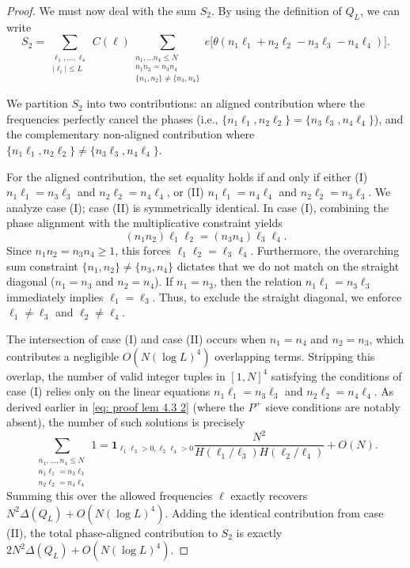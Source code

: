 \documentclass[12pt]{amsart}
\renewcommand{\leq}{\leqslant}
\renewcommand{\ge}{\geqslant}
\numberwithin{equation}{section}
\theoremstyle{plain}
\theoremstyle{definition}
\renewcommand{\l}{\ell}
\begin{document}
\begin{proof}
		We must now deal with the sum $S_2$. By using the definition of $Q_L$, we can write
		$$S_2 = \sum_{\substack{\l_1,\dots ,\l_4 \\ |\l_i| \leq L}}C(\bm{\l})\sum_{\substack{n_1,\dots n_4 \leq N \\ n_1n_2=n_3n_4 \\ \{n_1,n_2\}\ne\{n_3,n_4\}}}e\big[\theta (n_1\l_1+n_2\l_2-n_3\l_3-n_4\l_4)\big].$$
		
		We partition $S_2$ into two contributions: an aligned contribution where the frequencies perfectly cancel the phases (i.e., $\{n_1\l_1,n_2\l_2\}=\{n_3\l_3,n_4\l_4\}$), and the complementary non-aligned contribution where $\{n_1\l_1,n_2\l_2\}\ne\{n_3\l_3,n_4\l_4\}$. 
		
		For the aligned contribution, the set equality holds if and only if either (I) $n_1\l_1=n_3\l_3$ and $n_2\l_2=n_4\l_4$, or (II) $n_1\l_1=n_4\l_4$ and $n_2\l_2=n_3\l_3$. We analyze case (I); case (II) is symmetrically identical. In case (I), combining the phase alignment with the multiplicative constraint yields 
		$$ (n_1 n_2) \l_1 \l_2 = (n_3 n_4) \l_3 \l_4. $$
		Since $n_1n_2 = n_3n_4 \ge 1$, this forces $\l_1\l_2 = \l_3\l_4$. Furthermore, the overarching sum constraint $\{n_1, n_2\} \ne \{n_3, n_4\}$ dictates that we do not match on the straight diagonal ($n_1=n_3$ and $n_2=n_4$). If $n_1 = n_3$, then the relation $n_1\l_1 = n_3\l_3$ immediately implies $\l_1 = \l_3$. Thus, to exclude the straight diagonal, we enforce $\l_1 \ne \l_3$ and $\l_2 \ne \l_4$. 
		
		The intersection of case (I) and case (II) occurs when $n_1=n_4$ and $n_2=n_3$, which contributes a negligible $O(N(\log L)^4)$ overlapping terms. Stripping this overlap, the number of valid integer tuples in $[1, N]^4$ satisfying the conditions of case (I) relies only on the linear equations $n_1\l_1=n_3\l_3$ and $n_2\l_2=n_4\l_4$. As derived earlier in \eqref{eq: proof lem 4.3 2} (where the $P^+$ sieve conditions are notably absent), the number of such solutions is precisely 
		$$ \sum_{\substack{n_1,\dots,n_4 \leq N \\ n_1\l_1 = n_3 \l_3 \\ n_2\l_2 = n_4\l_4}} 1 = \bm{1}_{\l_1\l_3 > 0, \l_2\l_4>0} \frac{N^2}{H(\l_1/\l_3)H(\l_2/\l_4)} + O(N). $$ 
		Summing this over the allowed frequencies $\bm{\l}$ exactly recovers $N^2 \Delta(Q_L) + O(N(\log L)^4)$. Adding the identical contribution from case (II), the total phase-aligned contribution to $S_2$ is exactly $2N^2 \Delta(Q_L) + O(N(\log L)^4)$.
		

\end{proof}
\end{document}
